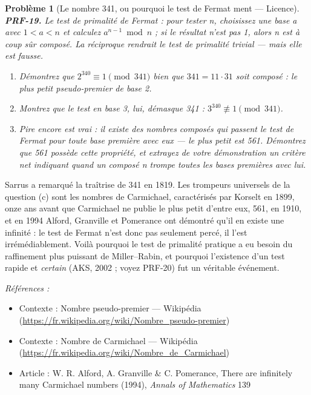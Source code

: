 \documentclass[11pt]{article}
\newtheorem{problem}{Problème}
\newenvironment{refs}{\par\small\noindent\emph{Références :}\begin{itemize}\setlength\itemsep{0pt}}{\end{itemize}\normalsize}
\begin{document}
\bigskip

\begin{problem}[{Le nombre 341, ou pourquoi le test de Fermat ment --- Licence}]
\textbf{PRF-19.} Le test de primalité de Fermat : pour tester n, choisissez une base a
avec $ 1 <a <n $ et calculez $ a^{n-1} \bmod n $ ; si le résultat n'est pas 1,
alors n est à coup sûr composé. La réciproque rendrait le test de primalité trivial --- mais
elle est fausse.
\begin{enumerate}
\item[(a)] Démontrez que $ 2^{340} \equiv 1 \pmod{341} $ bien que
$ 341 = 11 \cdot 31 $ soit composé : le plus petit pseudo-premier de base 2.
\item[(b)] Montrez que
le test en base 3, lui, démasque 341 : $ 3^{340} \not\equiv 1 \pmod{341} $.
\item[(c)] Pire
encore est vrai : il existe des nombres composés qui passent le test de Fermat pour
\textit{toute} base première avec eux --- le plus petit est 561. Démontrez que 561 possède cette
propriété, et extrayez de votre démonstration un critère net indiquant quand un composé n
trompe toutes les bases premières avec lui.
\end{enumerate}

\end{problem}

\noindent Sarrus a remarqué la traîtrise de 341 en 1819. Les trompeurs universels de
la question (c) sont les nombres de Carmichael, caractérisés par Korselt en 1899, onze ans
avant que Carmichael ne publie le plus petit d'entre eux, 561, en 1910, et en 1994 Alford, Granville et Pomerance ont démontré
qu'il en existe une infinité : le test de Fermat n'est donc pas seulement percé, il l'est
irrémédiablement. Voilà pourquoi le test de primalité pratique a eu besoin du raffinement
plus puissant de Miller--Rabin, et pourquoi l'existence d'un test rapide et \textit{certain}
(AKS, 2002 ; voyez PRF-20) fut un véritable événement.

\begin{refs}
\item Contexte : Nombre pseudo-premier --- Wikipédia (\url{https://fr.wikipedia.org/wiki/Nombre_pseudo-premier})
\item Contexte : Nombre de Carmichael --- Wikipédia (\url{https://fr.wikipedia.org/wiki/Nombre_de_Carmichael})
\item Article : W. R. Alford, A. Granville \& C. Pomerance, \og{} There are infinitely many Carmichael numbers \fg{} (1994), \textit{Annals of Mathematics} 139
\end{refs}
\end{document}
